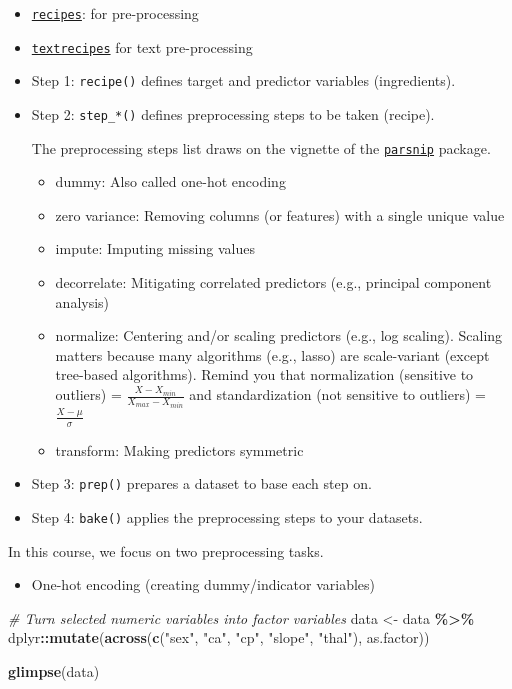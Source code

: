 \documentclass[
]{book}
\newenvironment{Shaded}{\begin{snugshade}}{\end{snugshade}}
\newcommand{\CommentTok}[1]{\textcolor[rgb]{0.56,0.35,0.01}{\textit{#1}}}
\newcommand{\KeywordTok}[1]{\textcolor[rgb]{0.13,0.29,0.53}{\textbf{#1}}}
\newcommand{\NormalTok}[1]{#1}
\newcommand{\OperatorTok}[1]{\textcolor[rgb]{0.81,0.36,0.00}{\textbf{#1}}}
\newcommand{\StringTok}[1]{\textcolor[rgb]{0.31,0.60,0.02}{#1}}
\providecommand{\tightlist}{%
  \setlength{\itemsep}{0pt}\setlength{\parskip}{0pt}}
\begin{document}
\begin{itemize}
\item
  \href{https://recipes.tidymodels.org/index.html}{\texttt{recipes}}: for pre-processing
\item
  \href{https://github.com/tidymodels/textrecipes}{\texttt{textrecipes}} for text pre-processing
\item
  Step 1: \texttt{recipe()} defines target and predictor variables (ingredients).
\item
  Step 2: \texttt{step\_*()} defines preprocessing steps to be taken (recipe).

  The preprocessing steps list draws on the vignette of the \href{https://www.tidymodels.org/find/parsnip/}{\texttt{parsnip}} package.

  \begin{itemize}
  \item
    dummy: Also called one-hot encoding
  \item
    zero variance: Removing columns (or features) with a single unique value
  \item
    impute: Imputing missing values
  \item
    decorrelate: Mitigating correlated predictors (e.g., principal component analysis)
  \item
    normalize: Centering and/or scaling predictors (e.g., log scaling). Scaling matters because many algorithms (e.g., lasso) are scale-variant (except tree-based algorithms). Remind you that normalization (sensitive to outliers) = \(\frac{X - X_{min}}{X_{max} - X_{min}}\) and standardization (not sensitive to outliers) = \(\frac{X - \mu}{\sigma}\)
  \item
    transform: Making predictors symmetric
  \end{itemize}
\item
  Step 3: \texttt{prep()} prepares a dataset to base each step on.
\item
  Step 4: \texttt{bake()} applies the preprocessing steps to your datasets.
\end{itemize}

In this course, we focus on two preprocessing tasks.

\begin{itemize}
\tightlist
\item
  One-hot encoding (creating dummy/indicator variables)
\end{itemize}

\begin{Shaded}
\begin{Highlighting}[]
\CommentTok{\# Turn selected numeric variables into factor variables}
\NormalTok{data \textless{}{-}}\StringTok{ }\NormalTok{data }\OperatorTok{\%\textgreater{}\%}
\StringTok{  }\NormalTok{dplyr}\OperatorTok{::}\KeywordTok{mutate}\NormalTok{(}\KeywordTok{across}\NormalTok{(}\KeywordTok{c}\NormalTok{(}\StringTok{"sex"}\NormalTok{, }\StringTok{"ca"}\NormalTok{, }\StringTok{"cp"}\NormalTok{, }\StringTok{"slope"}\NormalTok{, }\StringTok{"thal"}\NormalTok{), as.factor))}

\KeywordTok{glimpse}\NormalTok{(data)}
\end{Highlighting}
\end{Shaded}
\end{document}
